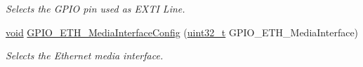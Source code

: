 \begin{DoxyCompactItemize}
\begin{DoxyCompactList}\small\item\em Selects the G\+P\+IO pin used as E\+X\+TI Line. \end{DoxyCompactList}\item 
\hyperlink{usb__devapi_8h_afabf60e7f57651d6d595a02c75f07cd0}{void} \hyperlink{group___g_p_i_o___private___functions_gacbfad958f684347be0f2c762dc85c3c2}{G\+P\+I\+O\+\_\+\+E\+T\+H\+\_\+\+Media\+Interface\+Config} (\hyperlink{_p_e___types_8h_a33594304e786b158f3fb30289278f5af}{uint32\+\_\+t} G\+P\+I\+O\+\_\+\+E\+T\+H\+\_\+\+Media\+Interface)
\begin{DoxyCompactList}\small\item\em Selects the Ethernet media interface. \end{DoxyCompactList}\end{DoxyCompactItemize}
